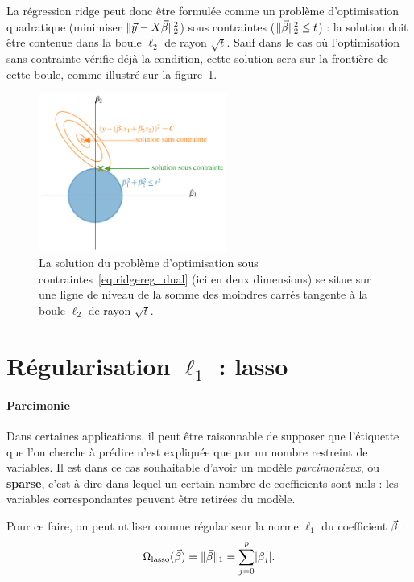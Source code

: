 La régression ridge peut donc être formulée comme un problème d'optimisation
quadratique (minimiser $\ltwonorm{\yy - X \bbeta}^2$) sous contraintes
($\ltwonorm{\bbeta}^2 \leq t$) : la solution doit être contenue dans la boule
$\ell_2$ de rayon $\sqrt{t}$. Sauf dans le cas où l'optimisation sans
contrainte vérifie déjà la condition, cette solution sera sur la frontière de
cette boule, comme illustré sur la figure~\ref{fig:l2reg}.

\begin{figure}[h]
  \centering
  \includegraphics[width=0.55\textwidth]{figures/generalisation/l2reg}
  \caption{La solution du problème d'optimisation sous
    contraintes~\eqref{eq:ridgereg_dual} (ici en deux dimensions) se situe sur
    une ligne de niveau de la somme des moindres carrés tangente à la boule
    $\ell_2$ de rayon $\sqrt{t}$.}
  \label{fig:l2reg}
\end{figure}
  
\section{Régularisation $\ell_1$ : lasso}
\label{sec:lasso}

\paragraph{Parcimonie}
Dans certaines applications, il peut être raisonnable de supposer que
l'étiquette que l'on cherche à prédire n'est expliquée que par un nombre
restreint de variables. Il est dans ce cas souhaitable d'avoir un modèle {\it
  parcimonieux}, ou \textbf{sparse}, c'est-à-dire dans lequel un certain nombre de
coefficients sont nuls : les variables correspondantes peuvent être retirées du
modèle.

Pour ce faire, on peut utiliser comme
régulariseur la norme $\ell_1$ du coefficient $\bbeta$ :
\begin{equation}
  \label{eq:l1norm_reg}
  \Omega_{\text{lasso}}(\bbeta) = \lonenorm{\bbeta} = \sum_{j=0}^p \lvert \beta_j \rvert.
\end{equation}

